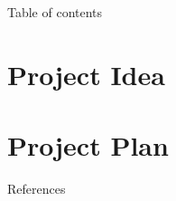 \documentclass[compress,aspectratio=169]{beamer}
\begin{document}
\begin{frame}[plain]
	\titlepage
\end{frame}

\begin{frame}[t]{Table of contents}
  \tableofcontents[subsectionstyle=hide/hide]
\end{frame}


\section{Project Idea}



\section{Project Plan}



\begin{frame}{References}
    \renewcommand*{\bibfont}{\normalfont\scriptsize}
    \printbibliography[heading=none]
\end{frame}
\end{document}
